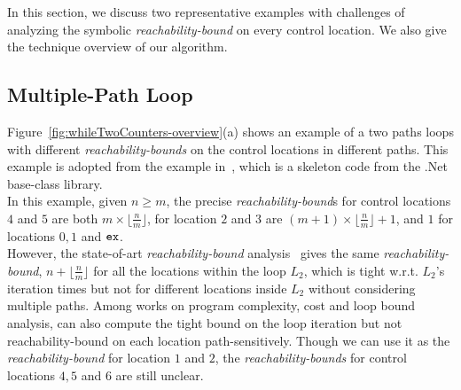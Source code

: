 In this section, we discuss two representative examples with
challenges of analyzing the symbolic
\emph{reachability-bound} on
every control location.
We also give the technique overview of our algorithm.
%
\subsection{Multiple-Path Loop}
\label{sec:overview-multiplepath}

Figure~\ref{fig:whileTwoCounters-overview}(a) shows an example of a two paths loops
with different \emph{reachability-bounds} on the control locations in different paths.
This example is adopted from the example in~\cite{Sumit2010rechability}, which
is a skeleton code from the .Net base-class library.
\\
In this example, given $n \geq m$,
the precise \emph{reachability-bound}s for control locations $4$ and $5$ are both $m \times \lfloor\frac{n}{m}\rfloor$,
for location $2$ and $3$ are $(m + 1) \times \lfloor\frac{n}{m}\rfloor + 1$, 
and $1$ for locations $0, 1$ and $\mathtt{ex}$. 
\\
However, the state-of-art \emph{reachability-bound} analysis~\cite{Sumit2010rechability}
gives the same \emph{reachability-bound}, $n + \lfloor\frac{n}{m}\rfloor$ for all the locations within the loop $L_2$, which is tight w.r.t. $L_2$'s iteration times but not for different locations inside $L_2$ without considering multiple paths.
Among works on program complexity, cost and loop bound analysis, \cite{GulwaniJK09} can also compute the tight bound on the loop iteration but not reachability-bound on each location path-sensitively.
Though we can use it as the \emph{reachability-bound} for location $1$ and $2$,
the \emph{reachability-bounds} for control locations $4, 5$ and $6$ are still unclear.
